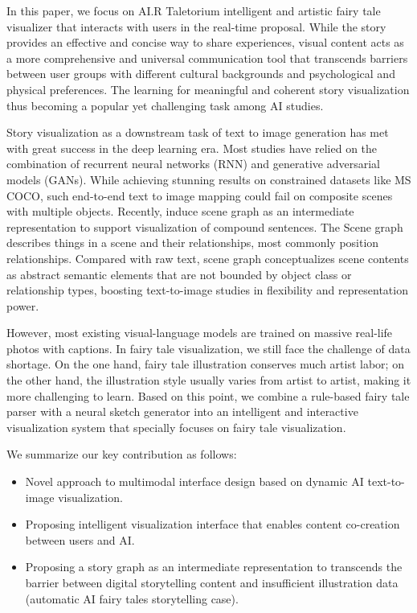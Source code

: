 In this paper, we focus on AI.R Taletorium intelligent and artistic fairy tale visualizer that interacts with users in the real-time proposal. While the story provides an effective and concise way to share experiences, visual content acts as a more comprehensive and universal communication tool that transcends barriers between user groups with different cultural backgrounds and psychological and physical preferences. The learning for meaningful and coherent story visualization thus becoming a popular yet challenging task among AI studies.

Story visualization as a downstream task of text to image generation has met with great success in the deep learning era. Most studies \cite{Gregor2015DRAWAR,Johnson,Johnson2018,Li2019ObjectDrivenTS,Liu2020,Rose2010} have relied on the combination of recurrent neural networks (RNN) and generative adversarial models (GANs). While achieving stunning results on constrained datasets like MS COCO, such end-to-end text to image mapping could fail on composite scenes with multiple objects. Recently, \cite{Herzig2019,Huang2019,Mirza2014} induce scene graph as an intermediate representation to support visualization of compound sentences. The Scene graph \cite{Johnson} describes things in a scene and their relationships, most commonly position relationships. Compared with raw text, scene graph conceptualizes scene contents as abstract semantic elements that are not bounded by object class or relationship types, boosting text-to-image studies in flexibility and representation power.


However, most existing visual-language models are trained on massive real-life photos with captions. In fairy tale visualization, we still face the challenge of data shortage. On the one hand, fairy tale illustration conserves much artist labor; on the other hand, the illustration style usually varies from artist to artist, making it more challenging to learn. Based on this point, we combine a rule-based fairy tale parser with a neural sketch generator into an intelligent and interactive visualization system that specially focuses on fairy tale visualization.

We summarize our key contribution as follows: 
\begin{itemize}
\item Novel approach to multimodal interface design based on dynamic AI text-to-image visualization.
\item Proposing intelligent visualization interface that enables content co-creation between users and AI.
\item Proposing a story graph as an intermediate representation to transcends the barrier between digital storytelling content and insufficient illustration data (automatic AI fairy tales storytelling case).
\end{itemize}

